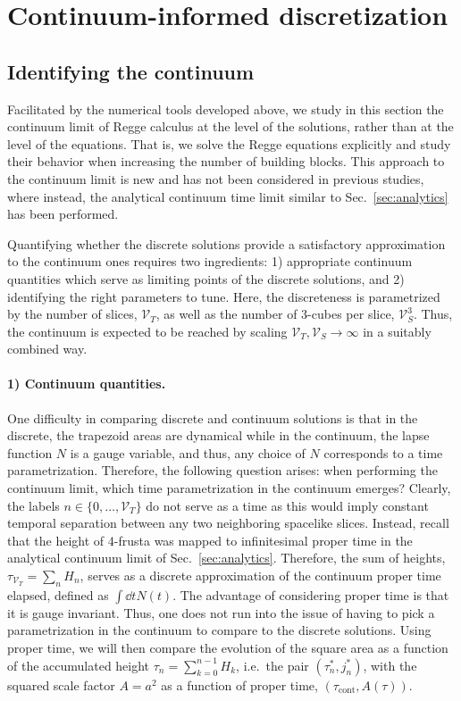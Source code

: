\documentclass[amsmath,amssymb,aps,twocolumn,superscriptaddress,nofootinbib]{revtex4-1}
\begin{document}
\section{Continuum-informed discretization}\label{sec:continuum limit}

\subsection{Identifying the continuum}

Facilitated by the numerical tools developed above, we study in this section the continuum limit of Regge calculus at the level of the solutions, rather than at the level of the equations. That is, we solve the Regge equations explicitly and study their behavior when increasing the number of building blocks.
This approach to the continuum limit is new and has not been considered in previous studies, where instead, the analytical continuum time limit similar to Sec.~\ref{sec:analytics} has been performed.

Quantifying whether the discrete solutions provide a satisfactory approximation to the continuum ones requires two ingredients:
1) appropriate continuum quantities which serve as limiting points of the discrete solutions, and
2) identifying the right parameters to tune. 
Here, the discreteness is parametrized by the number of slices, $\mathcal{V}_T$, as well as the number of $3$-cubes per slice, $\mathcal{V}_S^3$.
Thus, the continuum is expected to be reached by scaling $\mathcal{V}_T,\mathcal{V}_S\rightarrow\infty$ in a suitably combined way.

\paragraph*{1) Continuum quantities.} One difficulty in comparing discrete and continuum solutions is that in the discrete, the trapezoid areas are dynamical while in the continuum, the lapse function $N$ is a gauge variable, and thus, any choice of $N$ corresponds to a time parametrization.
Therefore, the following question arises: when performing the continuum limit, which time parametrization in the continuum emerges?
Clearly, the labels $n\in\{0,\dots,\mathcal{V}_T\}$ do not serve as a time as this would imply constant temporal separation between any two neighboring spacelike slices.
Instead, recall that the height of $4$-frusta was mapped to infinitesimal proper time in the analytical continuum limit of Sec.~\ref{sec:analytics}.
Therefore, the sum of heights, $\tau_{\mathcal{V}_T} = \sum_n H_n$, serves as a discrete approximation of the continuum proper time elapsed, defined as $\int \dd{t}N(t)$.
The advantage of considering proper time is that it is gauge invariant.
Thus, one does not run into the issue of having to pick a parametrization in the continuum to compare to the discrete solutions.
Using proper time, we will then compare the evolution of the square area as a function of the accumulated height $\tau_n = \sum_{k=0}^{n-1}H_{k}$, i.e.~the pair $(\tau^*_n, j^*_n)$, with the squared scale factor $A = a^2$ as a function of proper time, $(\tau_{\mathrm{cont}}, A(\tau))$.
\end{document}
